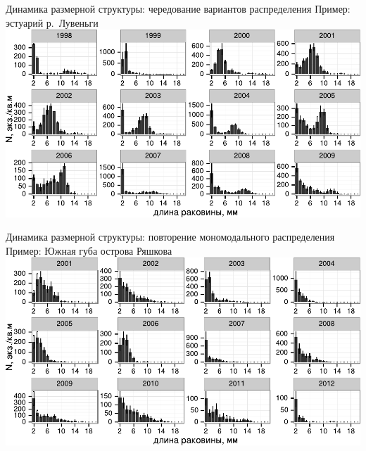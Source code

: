 \documentclass{beamer}
\begin{document}
\begin{frame}{Динамика размерной структуры: чередование вариантов распределения}
Пример: эстуарий р.~Лувеньги\\[2ex]

			\includegraphics[width=\textwidth]{Estuary_total_size_oneplot_nonscale1.pdf}\\
\end{frame}



\begin{frame}{Динамика размерной структуры: повторение мономодального распределения}
Пример: Южная губа острова Ряшкова\\[2ex]

			\includegraphics[width=\textwidth]{YuG_sizestr_oneplot_nonscale1.pdf}
\end{frame}
\end{document}
